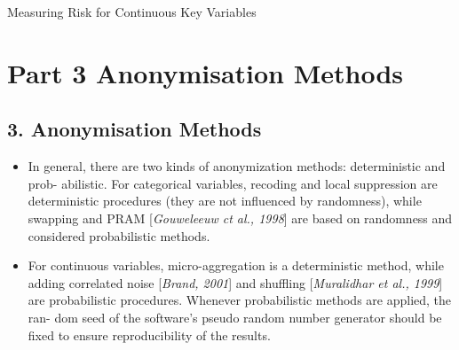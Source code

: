 \documentclass[]{article}
\title{}
\author{}
\begin{document}
Measuring Risk for Continuous Key Variables


\section*{Part 3 Anonymisation Methods}

 
 


\subsection*{3. Anonymisation Methods}
\begin{itemize}
\item In general, there are two kinds of anonymization methods: deterministic and prob-
abilistic. For categorical variables, recoding and local suppression are deterministic
procedures (they are not inﬂuenced by randomness), while swapping and PRAM
[\textit{Gouweleeuw ct al., 1998}] are based on randomness and considered probabilistic
methods. 
\item 
For continuous variables, micro-aggregation is a deterministic method,
while adding correlated noise [\textit{Brand, 2001}] and shuffling [\textit{Muralidhar et al., 1999}]
are probabilistic procedures. Whenever probabilistic methods are applied, the ran-
dom seed of the software’s pseudo random number generator should be ﬁxed to
ensure reproducibility of the results.
\end{itemize}
\newpage
\end{document}
